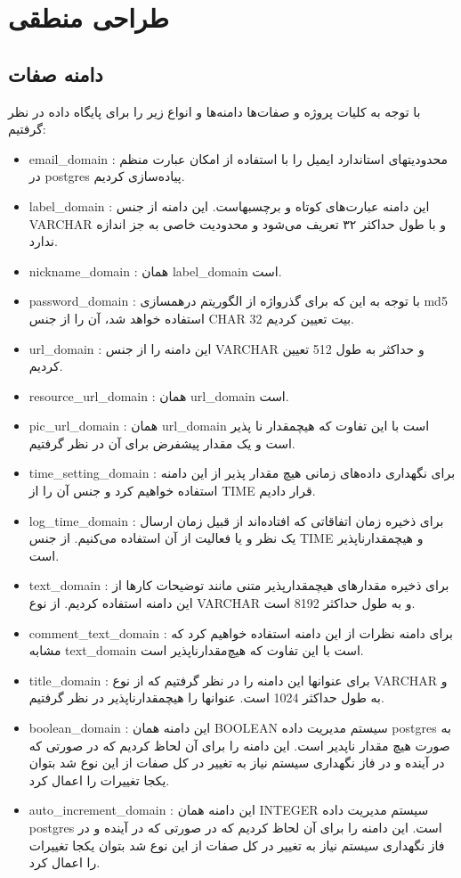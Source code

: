 \documentclass{article}
\begin{document}
\section*{طراحی منطقی}
\subsection*{دامنه صفات} \label{sect:domains}
با توجه به کلیات پروژه و صفات‌ها دامنه‌ها و انواع زیر را برای پایگاه داده در نظر گرفتیم:
\begin{itemize}
	\item
	email\_domain
	: محدودیتهای استاندارد ایمیل را با استفاده از امکان عبارت منظم در postgres پیاده‌سازی کردیم. 
	\item
	label\_domain
	: این دامنه عبارت‌های کوتاه و برچسبهاست. این دامنه از جنس VARCHAR و با طول حداکثر ۳۲ تعریف می‌شود و محدودیت خاصی به جز اندازه ندارد.
	\item
	nickname\_domain
	: همان label\_domain است. 
	\item
	password\_domain
	: با توجه به این که برای گذرواژه از الگوریتم درهمسازی md5 استفاده خواهد شد، آن را از جنس CHAR  32 بیت تعیین کردیم. 
	\item
	url\_domain
	: این دامنه را از جنس VARCHAR و حداکثر به طول 512 تعیین کردیم. 
	\item
	resource\_url\_domain
	: همان url\_domain است. 
	\item
	pic\_url\_domain
	: همان url\_domain است با این تفاوت که هیچمقدار نا پذیر است و یک مقدار پیشفرض  برای آن در نظر گرفتیم. 
	\item
	time\_setting\_domain
	: برای نگهداری داده‌های زمانی هیچ مقدار پذیر از این دامنه استفاده خواهیم کرد و جنس آن را از TIME قرار دادیم. 
	\item
	log\_time\_domain
	: برای ذخیره زمان اتفاقاتی که افتاده‌اند از قبیل زمان ارسال یک نظر و یا فعالیت از آن استفاده می‌کنیم. از جنس TIME و هیچمقدارناپذیر است. 
	\item
	text\_domain
	: برای ذخیره مقدارهای هیچمقدارپذیر متنی مانند توضیحات کارها از این دامنه استفاده کردیم. از نوع VARCHAR و به طول حداکثر 8192 است.
	\item
	comment\_text\_domain
	: برای دامنه نظرات از این دامنه استفاده خواهیم کرد که مشابه text\_domain است با این تفاوت که هیچ‌مقدارناپذیر است. 
	\item
	title\_domain
	: برای عنوانها این دامنه را در نظر گرفتیم که از نوع VARCHAR و به طول حداکثر 1024 است. عنوانها را هیچمقدارناپذیر در نظر گرفتیم. 
	\item
	boolean\_domain
	: این دامنه همان BOOLEAN سیستم مدیریت داده postgres به صورت هیچ مقدار ناپدیر است. این دامنه را برای آن لحاظ کردیم که در صورتی که در آینده و در فاز نگهداری سیستم نیاز به تغییر در کل صفات از این نوع شد بتوان یکجا تغییرات را اعمال کرد. 
	\item
	auto\_increment\_domain
	: این دامنه همان INTEGER سیستم مدیریت داده postgres است. این دامنه را برای آن لحاظ کردیم که در صورتی که در آینده و در فاز نگهداری سیستم نیاز به تغییر در کل صفات از این نوع شد بتوان یکجا تغییرات را اعمال کرد. 
\end{itemize}
\end{document}
